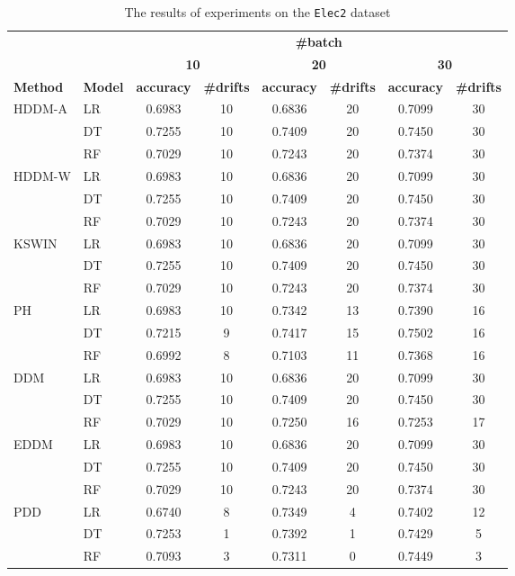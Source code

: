 \begin{table}[H]
    \centering
    \small
    \caption{The results of experiments on the \texttt{Elec2} dataset}
    \label{tab:exp_Elec2}
    \begin{tabular}{llcccccc}\toprule
        && \multicolumn{6}{c}{\textbf{\#batch}}\\\cmidrule(lr){3-8}
        && \multicolumn{2}{c}{\textbf{10}}    & \multicolumn{2}{c}{\textbf{20}} & \multicolumn{2}{c}{\textbf{30}} \\\cmidrule(lr){3-8}
        \textbf{Method} & \textbf{Model} & \textbf{accuracy} & \textbf{\#drifts} & \textbf{accuracy} & \textbf{\#drifts} & \textbf{accuracy} & \textbf{\#drifts} \\\midrule
        HDDM-A & LR & 0.6983 & 10 & 0.6836 & 20 & 0.7099 & 30 \\
        & DT & 0.7255 & 10 & 0.7409 & 20 & 0.7450 & 30 \\
        & RF & 0.7029 & 10 & 0.7243 & 20 & 0.7374 & 30 \\
        \midrule
        HDDM-W & LR & 0.6983 & 10 & 0.6836 & 20 & 0.7099 & 30 \\
        & DT & 0.7255 & 10 & 0.7409 & 20 & 0.7450 & 30 \\
        & RF & 0.7029 & 10 & 0.7243 & 20 & 0.7374 & 30 \\
        \midrule
        KSWIN & LR & 0.6983 & 10 & 0.6836 & 20 & 0.7099 & 30 \\
        & DT & 0.7255 & 10 & 0.7409 & 20 & 0.7450 & 30 \\
        & RF & 0.7029 & 10 & 0.7243 & 20 & 0.7374 & 30 \\
        \midrule
        PH & LR & 0.6983 & 10 & 0.7342 & 13 & 0.7390 & 16 \\
        & DT & 0.7215 & 9 & 0.7417 & 15 & 0.7502 & 16 \\
        & RF & 0.6992 & 8 & 0.7103 & 11 & 0.7368 & 16 \\
        \midrule
        DDM & LR & 0.6983 & 10 & 0.6836 & 20 & 0.7099 & 30 \\
        & DT & 0.7255 & 10 & 0.7409 & 20 & 0.7450 & 30 \\
        & RF & 0.7029 & 10 & 0.7250 & 16 & 0.7253 & 17 \\
        \midrule
        EDDM & LR & 0.6983 & 10 & 0.6836 & 20 & 0.7099 & 30 \\
        & DT & 0.7255 & 10 & 0.7409 & 20 & 0.7450 & 30 \\
        & RF & 0.7029 & 10 & 0.7243 & 20 & 0.7374 & 30 \\
        \midrule
        PDD & LR & 0.6740 & 8 & 0.7349 & 4 & 0.7402 & 12 \\
        & DT & 0.7253 & 1 & 0.7392 & 1 & 0.7429 & 5 \\
        & RF & 0.7093 & 3 & 0.7311 & 0 & 0.7449 & 3 \\
        \midrule
    \end{tabular}
\end{table}

